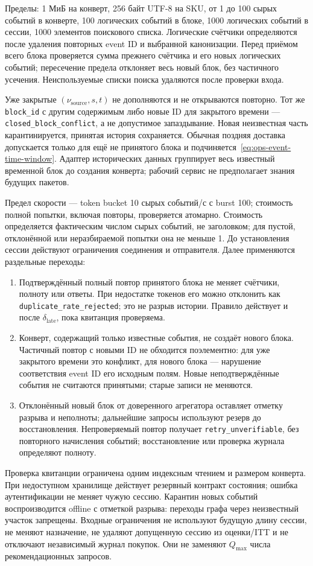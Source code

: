 \documentclass[12pt,a4paper]{article}
\newcommand{\code}[1]{{\ttfamily\small\nolinkurl{#1}}}
\theoremstyle{plainru}
\begin{document}
Пределы: 1 МиБ на конверт, 256 байт UTF-8 на SKU,
от 1 до 100 сырых событий в конверте, 100 логических событий в блоке,
1000 логических событий в сессии, 1000 элементов поискового списка.
Логические счётчики определяются после удаления повторных event ID
и выбранной канонизации. Перед приёмом всего блока проверяется
сумма прежнего счётчика и его новых логических событий; пересечение
предела отклоняет весь новый блок, без частичного усечения.
Неиспользуемые списки поиска удаляются после проверки входа.

Уже закрытые $(\nu_{\mathrm{source}},s,t)$ не дополняются и не открываются
повторно. Тот же \code{block_id} с другим содержимым либо новые ID
для закрытого времени --- \code{closed_block_conflict}, а не допустимое
запаздывание. Новая неизвестная часть карантинируется, принятая история
сохраняется. Обычная поздняя доставка допускается только для ещё
не принятого блока и подчиняется~\eqref{eq:ops-event-time-window}.
Адаптер исторических данных группирует весь известный временной блок
до создания конверта; рабочий сервис не предполагает знания будущих пакетов.

Предел скорости --- token bucket 10 сырых событий/с с burst 100;
стоимость полной попытки, включая повторы, проверяется атомарно.
Стоимость определяется фактическим числом сырых событий, не заголовком;
для пустой, отклонённой или неразбираемой попытки она не меньше 1.
До установления сессии действуют ограничения соединения и отправителя.
Далее применяются раздельные переходы:
\begin{enumerate}
\item Подтверждённый полный повтор принятого блока не меняет счётчики,
полноту или ответы. При недостатке токенов его можно отклонить как
\code{duplicate_rate_rejected}; это не разрыв истории. Правило действует
и после $\delta_{\mathrm{late}}$, пока квитанция проверяема.
\item Конверт, содержащий только известные события, не создаёт нового
блока. Частичный повтор с новыми ID не обходится поэлементно:
для уже закрытого времени это конфликт, для нового блока --- нарушение
соответствия event ID его исходным полям. Новые неподтверждённые события
не считаются принятыми; старые записи не меняются.
\item Отклонённый новый блок от доверенного агрегатора оставляет
отметку разрыва и неполноты; дальнейшие запросы используют резерв
до восстановления. Непроверяемый повтор получает
\code{retry_unverifiable}, без повторного начисления событий;
восстановление или проверка журнала определяют полноту.
\end{enumerate}
Проверка квитанции ограничена одним индексным чтением и размером
конверта. При недоступном хранилище действует резервный контракт
состояния; ошибка аутентификации не меняет чужую сессию.
Карантин новых событий воспроизводится offline с отметкой разрыва:
переходы графа через неизвестный участок запрещены. Входные ограничения
не используют будущую длину сессии, не меняют назначение, не удаляют
допущенную сессию из оценки/ITT и не отключают независимый журнал покупок.
Они не заменяют $Q_{\max}$ числа рекомендационных запросов.
\end{document}
